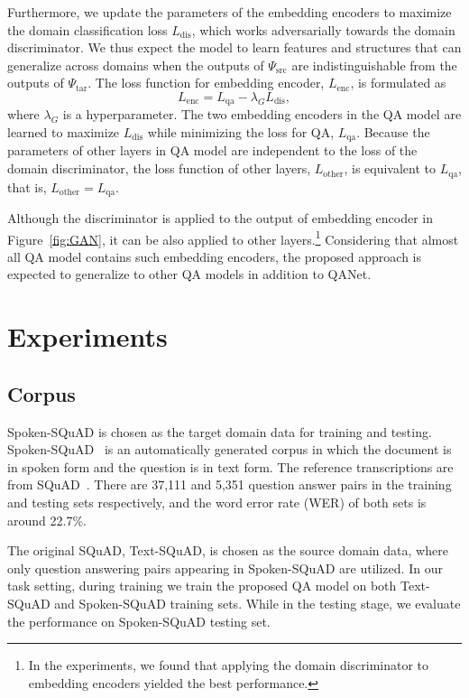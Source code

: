 \documentclass{article}
\begin{document}
Furthermore, we update the parameters of the embedding encoders to maximize the domain classification loss $L_\text{dis}$, which works adversarially towards the domain discriminator. 
We thus expect the model to learn features and structures that can generalize across domains when the outputs of $\Psi_\text{src}$ are indistinguishable from the outputs of $\Psi_\text{tar}$. 
The loss function for embedding encoder, $L_\text{enc}$, is formulated as
\begin{equation}
    L_\text{enc} =  L_\text{qa} - \lambda_G L_\text{dis}, \label{eq:L_pri}
\end{equation}
where $\lambda_G$ is a hyperparameter.
The two embedding encoders in the QA model are learned to maximize $L_\text{dis}$ while minimizing the loss for QA, $L_\text{qa}$.
Because the parameters of other layers in QA model are independent to the loss of the domain discriminator, the loss function of other layers, $L_\text{other}$, is equivalent to  $L_\text{qa}$, that is, $L_\text{other} =  L_\text{qa}$.  


Although the discriminator is applied to the output of embedding encoder in Figure~\ref{fig:GAN}, it can be also applied to other layers.\footnote{In the  experiments, we found that applying the domain discriminator to embedding encoders yielded the best performance.}
Considering that almost all QA model contains such embedding encoders, 
the proposed approach is expected to generalize to other QA models in addition to QANet.

\section{Experiments}

\subsection{Corpus}

Spoken-SQuAD is chosen as the target domain data for training and testing. Spoken-SQuAD~\cite{li2018spoken} is an automatically generated corpus in which the document is in spoken form and the question is in text form.
The reference transcriptions are from SQuAD~\cite{rajpurkar2016squad}.
There are 37,111 and 5,351 question answer pairs in the training and testing sets respectively, and the word error rate (WER) of both sets is around 22.7\%.

The original SQuAD, Text-SQuAD, is chosen as the source domain data, where only question answering pairs appearing in Spoken-SQuAD are utilized. 
In our task setting, during training we train the proposed QA model on both Text-SQuAD and Spoken-SQuAD training sets.
While in the testing stage, we evaluate the performance on Spoken-SQuAD testing set.
\end{document}

